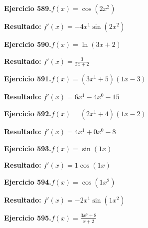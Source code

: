 \documentclass[10pt,a4paper]{article}
\begin{document}
\newpage
\begin{ejbox}
\textbf{Ejercicio 589.}\quad $f(x) = \cos(2x^{2})$
\end{ejbox}

\begin{solbox}
\textbf{Resultado:} \(\displaystyle f'(x) = -4x^{1}\sin(2x^{2})\)
\end{solbox}

\begin{ejbox}
\textbf{Ejercicio 590.}\quad $f(x) = \ln(3x + 2)$
\end{ejbox}

\begin{solbox}
\textbf{Resultado:} \(\displaystyle f'(x) = \frac{3}{3x + 2}\)
\end{solbox}

\begin{ejbox}
\textbf{Ejercicio 591.}\quad $f(x) = (3x^{1} +5)(1x -3)$
\end{ejbox}

\begin{solbox}
\textbf{Resultado:} \(\displaystyle f'(x) = 6x^{1} -4x^{0} -15\)
\end{solbox}

\newpage
\begin{ejbox}
\textbf{Ejercicio 592.}\quad $f(x) = (2x^{1} +4)(1x -2)$
\end{ejbox}

\begin{solbox}
\textbf{Resultado:} \(\displaystyle f'(x) = 4x^{1} +0x^{0} -8\)
\end{solbox}

\begin{ejbox}
\textbf{Ejercicio 593.}\quad $f(x) = \sin(1x)$
\end{ejbox}

\begin{solbox}
\textbf{Resultado:} \(\displaystyle f'(x) = 1\cos(1x)\)
\end{solbox}

\begin{ejbox}
\textbf{Ejercicio 594.}\quad $f(x) = \cos(1x^{2})$
\end{ejbox}

\begin{solbox}
\textbf{Resultado:} \(\displaystyle f'(x) = -2x^{1}\sin(1x^{2})\)
\end{solbox}

\newpage
\begin{ejbox}
\textbf{Ejercicio 595.}\quad $f(x) = \frac{3x^{3} +8}{x + 2}$
\end{ejbox}
\end{document}
